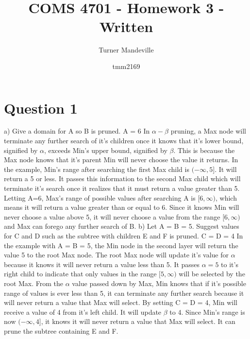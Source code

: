 \documentclass{article}
\title{COMS 4701 - Homework 3 - Written}
\author
{
Turner Mandeville
\and tmm2169
}
\begin{document}
    \maketitle

    \section*{Question 1}
    a) Give a domain for A so B is pruned.
    \newline
    A = 6
    \newline
    In $\alpha-\beta$ pruning, a Max node will terminate any further search of it's children once it knows that it's lower bound, signified by $\alpha$, exceeds Min's upper bound, signified by $\beta$. This is because the Max node knows that it's parent Min will never choose the value it returns.
    \newline
    In the example, Min's range after searching the first Max child is $(-\infty, 5]$. It will return a 5 or less. It passes this information to the second Max child which will terminate it's search once it realizes that it must return a value greater than 5. Letting A=6, Max's range of possible values after searching A is $[6, \infty)$, which means it will return a value greater than or equal to 6. Since it knows Min will never choose a value above 5, it will never choose a value from the range $[6, \infty)$ and Max can forego any further search of B.
    \newline
    \newline
    b) Let A = B = 5. Suggest values for C and D such as the subtree with children E and F is pruned.
    \newline
    C = D = 4
    \newline
    In the example with A = B = 5, the Min node in the second layer will return the value 5 to the root Max node. The root Max node will update it's value for $\alpha$ because it knows it will never return a value less than 5. It passes $\alpha=5$ to it's right child to indicate that only values in the range $[5, \infty)$ will be selected by the root Max. 
    \newline
    From the $\alpha$ value passed down by Max, Min knows that if it's possible range of values is ever less than 5, it can terminate any further search because it will never return a value that Max will select.
    \newline
    By setting C = D = 4, Min will receive a value of 4 from it's left child. It will update $\beta$ to 4. Since Min's range is now $(-\infty, 4]$, it knows it will never return a value that Max will select. It can prune the subtree containing E and F.
    
\end{document}

